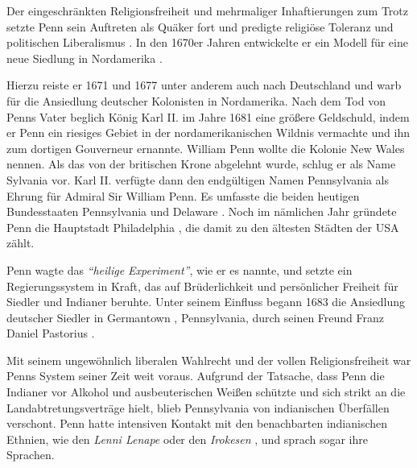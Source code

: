 \medskip

Der eingeschränkten Religionsfreiheit und mehrmaliger Inhaftierungen zum Trotz
setzte Penn sein Auftreten als Quäker fort und predigte  religiöse Toleranz  und
politischen Liberalismus . In den 1670er Jahren entwickelte er ein Modell für
eine neue Siedlung in Nordamerika .

\medskip

Hierzu reiste er 1671 und 1677 unter anderem auch nach Deutschland 
und warb für die Ansiedlung  deutscher Kolonisten  in Nordamerika. Nach dem Tod
von Penns Vater beglich König Karl II. im Jahre 1681
eine größere Geldschuld, indem er Penn ein riesiges Gebiet in der
nordamerikanischen Wildnis vermachte und ihn zum dortigen Gouverneur
ernannte. William Penn wollte die Kolonie New Wales nennen. Als das von der
britischen Krone abgelehnt wurde, schlug er als Name Sylvania vor. Karl II.
verfügte dann den endgültigen Namen Pennsylvania  als Ehrung für Admiral Sir 
William Penn. Es umfasste die beiden heutigen Bundesstaaten Pennsylvania und
Delaware . Noch im nämlichen Jahr gründete Penn die Hauptstadt
Philadelphia , die damit zu den ältesten Städten der USA  zählt.

\medskip

Penn wagte das \textit{"`heilige Experiment"'}, wie er es nannte, und setzte ein
Regierungssystem  in Kraft, das auf Brüderlichkeit und persönlicher Freiheit für
Siedler und Indianer  beruhte. Unter seinem Einfluss
begann 1683 die Ansiedlung deutscher Siedler in Germantown ,
Pennsylvania, durch seinen Freund Franz Daniel Pastorius .

\medskip

Mit seinem ungewöhnlich liberalen Wahlrecht  und der vollen Religionsfreiheit 
war Penns System seiner Zeit weit voraus. Aufgrund der Tatsache, dass Penn die
Indianer vor Alkohol  und ausbeuterischen Weißen  schützte und sich strikt an
die Landabtretungsverträge  hielt, blieb Pennsylvania von indianischen Überfällen
verschont. Penn hatte intensiven Kontakt mit den benachbarten indianischen
Ethnien, wie den \textit{Lenni Lenape}  oder den \textit{Irokesen} , und sprach sogar
ihre Sprachen.

